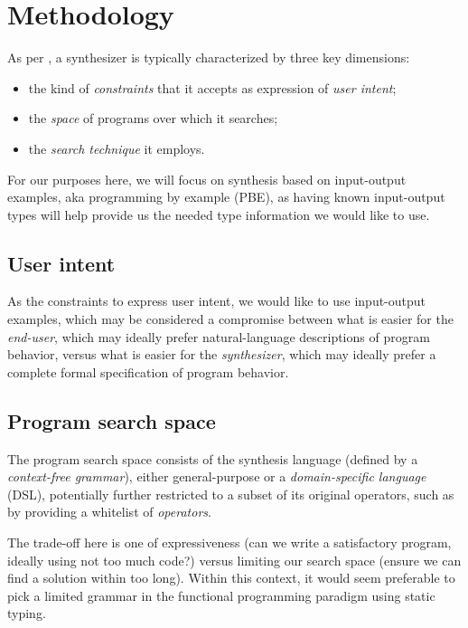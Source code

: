 \documentclass{article}
\begin{document}

\section{Methodology} %

As per \citet{gulwani2017program}, a synthesizer is typically characterized by three key dimensions:
\begin{itemize}
    \item the kind of \emph{constraints} that it accepts as expression of \emph{user intent};
    \item the \emph{space} of programs over which it searches;
    \item the \emph{search technique} it employs.
\end{itemize}

For our purposes here, we will focus on synthesis based on input-output examples, aka programming by example (PBE),
as having known input-output types will help provide us the needed type information we would like to use.

\subsection{User intent}

As the constraints to express user intent, we would like to use input-output examples, which may be considered a compromise between what is easier for the \emph{end-user}, which may ideally prefer natural-language descriptions of program behavior, versus what is easier for the \emph{synthesizer}, which may ideally prefer a complete formal specification of program behavior.

\subsection{Program search space}

The program search space consists of the synthesis language (defined by a \emph{context-free grammar}), either general-purpose or a \emph{domain-specific language} (DSL), potentially further restricted to a subset of its original operators, such as by providing a whitelist of \emph{operators}.

The trade-off here is one of expressiveness (can we write a satisfactory program, ideally using not too much code?) versus limiting our search space (ensure we can find a solution within too long).
Within this context, it would seem preferable to pick a limited grammar in the functional programming paradigm using static typing.
\end{document}
